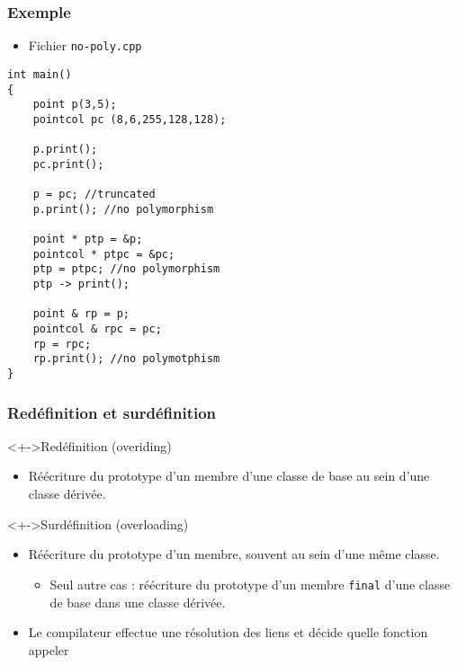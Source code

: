 \begin{frame}[containsverbatim]
\frametitle{Exemple}
\begin{itemize}
\item Fichier \texttt{no-poly.cpp}
\end{itemize}
\begin{lstlisting}
int main()
{
	point p(3,5);	
	pointcol pc (8,6,255,128,128);	

	p.print();
	pc.print();

	p = pc; //truncated
	p.print(); //no polymorphism

	point * ptp = &p;
	pointcol * ptpc = &pc;
	ptp = ptpc; //no polymorphism
	ptp -> print();	
	
	point & rp = p;
	pointcol & rpc = pc;
	rp = rpc;
	rp.print(); //no polymotphism
}
\end{lstlisting}
\end{frame}

\begin{frame}
\frametitle{Redéfinition et surdéfinition}
\begin{exampleblock}<+->{Redéfinition (overiding)}
	\begin{itemize}[<+->]
	\item Réécriture du prototype d'un membre d'une classe de base au sein d'une classe dérivée.
	\end{itemize}
\end{exampleblock}
\begin{exampleblock}<+->{Surdéfinition (overloading)}
	\begin{itemize}[<+->]
	\item Réécriture du prototype d'un membre, souvent au sein d'une même classe.	
		\begin{itemize}
		\item Seul autre cas : réécriture du prototype d'un membre \texttt{final} d'une classe de base dans une classe dérivée.
		\end{itemize}
	\end{itemize}
\end{exampleblock}
\begin{itemize}[<+->]
\item Le compilateur effectue une résolution des liens et décide quelle fonction appeler
\end{itemize}
\end{frame}

